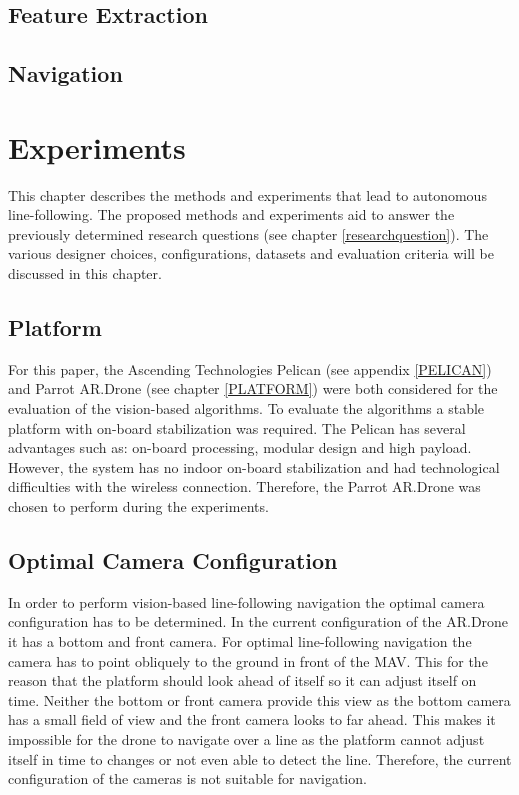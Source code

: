 \documentclass[a4paper]{article}
\begin{document}
\subsection{Feature Extraction}

\subsection{Navigation}
\newpage
\section{Experiments}
\label{EXPERIMENTS}
This chapter describes the methods and experiments that lead to autonomous line-following. The proposed methods and experiments aid to answer the previously determined research questions (see chapter \ref{researchquestion}). The various designer choices, configurations, datasets and evaluation criteria will be discussed in this chapter.

\subsection{Platform}
For this paper, the Ascending Technologies Pelican (see appendix \ref{PELICAN}) and Parrot AR.Drone (see chapter \ref{PLATFORM}) were both considered for the evaluation of the vision-based algorithms. To evaluate the algorithms a stable platform with on-board stabilization was required. The Pelican has several advantages such as: on-board processing, modular design and high payload. However, the system has no indoor on-board stabilization and had technological difficulties with the wireless connection. Therefore, the Parrot AR.Drone was chosen to perform during the experiments.

\subsection{Optimal Camera Configuration}
In order to perform vision-based line-following navigation the optimal camera configuration has to be determined. In the current configuration of the AR.Drone it has a bottom and front camera. For optimal line-following navigation the camera has to point obliquely to the ground in front of the MAV. This for the reason that the platform should look ahead of itself so it can adjust itself on time. Neither the bottom or front camera provide this view as the bottom camera has a small field of view and the front camera looks to far ahead. This makes it impossible for the drone to navigate over a line as the platform cannot adjust itself in time to changes or not even able to detect the line. Therefore, the current configuration of the cameras is not suitable for navigation.
\end{document}
